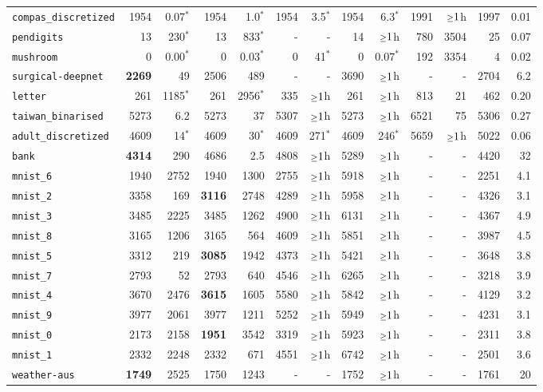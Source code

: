 \begin{tabular}{lrrrrrrrrrrrr}
\texttt{compas\_discretized} & 1954 & 0.07$^*$ & 1954 & 1.0$^*$ & 1954 & 3.5$^*$ & 1954 & 6.3$^*$ & 1991 & $\mathsmaller{\geq}1$h & 1997 & 0.01\\
\texttt{pendigits} & 13 & 230$^*$ & 13 & 833$^*$ & - & - & 14 & $\mathsmaller{\geq}1$h & 780 & 3504 & 25 & 0.07\\
\texttt{mushroom} & 0 & 0.00$^*$ & 0 & 0.03$^*$ & 0 & 41$^*$ & 0 & 0.07$^*$ & 192 & 3354 & 4 & 0.02\\
\texttt{surgical-deepnet} & \textbf{2269} & 49 & 2506 & 489 & - & - & 3690 & $\mathsmaller{\geq}1$h & - & - & 2704 & 6.2\\
\texttt{letter} & 261 & 1185$^*$ & 261 & 2956$^*$ & 335 & $\mathsmaller{\geq}1$h & 261 & $\mathsmaller{\geq}1$h & 813 & 21 & 462 & 0.20\\
\texttt{taiwan\_binarised} & 5273 & 6.2 & 5273 & 37 & 5307 & $\mathsmaller{\geq}1$h & 5273 & $\mathsmaller{\geq}1$h & 6521 & 75 & 5306 & 0.27\\
\texttt{adult\_discretized} & 4609 & 14$^*$ & 4609 & 30$^*$ & 4609 & 271$^*$ & 4609 & 246$^*$ & 5659 & $\mathsmaller{\geq}1$h & 5022 & 0.06\\
\texttt{bank} & \textbf{4314} & 290 & 4686 & 2.5 & 4808 & $\mathsmaller{\geq}1$h & 5289 & $\mathsmaller{\geq}1$h & - & - & 4420 & 32\\
\texttt{mnist\_6} & 1940 & 2752 & 1940 & 1300 & 2755 & $\mathsmaller{\geq}1$h & 5918 & $\mathsmaller{\geq}1$h & - & - & 2251 & 4.1\\
\texttt{mnist\_2} & 3358 & 169 & \textbf{3116} & 2748 & 4289 & $\mathsmaller{\geq}1$h & 5958 & $\mathsmaller{\geq}1$h & - & - & 4326 & 3.1\\
\texttt{mnist\_3} & 3485 & 2225 & 3485 & 1262 & 4900 & $\mathsmaller{\geq}1$h & 6131 & $\mathsmaller{\geq}1$h & - & - & 4367 & 4.9\\
\texttt{mnist\_8} & 3165 & 1206 & 3165 & 564 & 4609 & $\mathsmaller{\geq}1$h & 5851 & $\mathsmaller{\geq}1$h & - & - & 3987 & 4.5\\
\texttt{mnist\_5} & 3312 & 219 & \textbf{3085} & 1942 & 4373 & $\mathsmaller{\geq}1$h & 5421 & $\mathsmaller{\geq}1$h & - & - & 3648 & 3.8\\
\texttt{mnist\_7} & 2793 & 52 & 2793 & 640 & 4546 & $\mathsmaller{\geq}1$h & 6265 & $\mathsmaller{\geq}1$h & - & - & 3218 & 3.9\\
\texttt{mnist\_4} & 3670 & 2476 & \textbf{3615} & 1605 & 5580 & $\mathsmaller{\geq}1$h & 5842 & $\mathsmaller{\geq}1$h & - & - & 4129 & 3.2\\
\texttt{mnist\_9} & 3977 & 2061 & 3977 & 1211 & 5252 & $\mathsmaller{\geq}1$h & 5949 & $\mathsmaller{\geq}1$h & - & - & 4231 & 3.1\\
\texttt{mnist\_0} & 2173 & 2158 & \textbf{1951} & 3542 & 3319 & $\mathsmaller{\geq}1$h & 5923 & $\mathsmaller{\geq}1$h & - & - & 2311 & 3.8\\
\texttt{mnist\_1} & 2332 & 2248 & 2332 & 671 & 4551 & $\mathsmaller{\geq}1$h & 6742 & $\mathsmaller{\geq}1$h & - & - & 2501 & 3.6\\
\texttt{weather-aus} & \textbf{1749} & 2525 & 1750 & 1243 & - & - & 1752 & $\mathsmaller{\geq}1$h & - & - & 1761 & 20\\
\bottomrule
\end{tabular}
